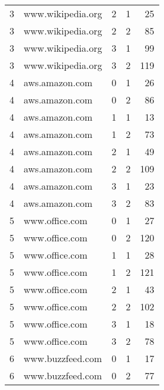 \begin{tabular}{rllrr}
  3 &    www.wikipedia.org &                  2 &       1 &               25 \\
  3 &    www.wikipedia.org &                  2 &       2 &               85 \\
  3 &    www.wikipedia.org &                  3 &       1 &               99 \\
  3 &    www.wikipedia.org &                  3 &       2 &              119 \\
  4 &       aws.amazon.com &                  0 &       1 &               26 \\
  4 &       aws.amazon.com &                  0 &       2 &               86 \\
  4 &       aws.amazon.com &                  1 &       1 &               13 \\
  4 &       aws.amazon.com &                  1 &       2 &               73 \\
  4 &       aws.amazon.com &                  2 &       1 &               49 \\
  4 &       aws.amazon.com &                  2 &       2 &              109 \\
  4 &       aws.amazon.com &                  3 &       1 &               23 \\
  4 &       aws.amazon.com &                  3 &       2 &               83 \\
  5 &       www.office.com &                  0 &       1 &               27 \\
  5 &       www.office.com &                  0 &       2 &              120 \\
  5 &       www.office.com &                  1 &       1 &               28 \\
  5 &       www.office.com &                  1 &       2 &              121 \\
  5 &       www.office.com &                  2 &       1 &               43 \\
  5 &       www.office.com &                  2 &       2 &              102 \\
  5 &       www.office.com &                  3 &       1 &               18 \\
  5 &       www.office.com &                  3 &       2 &               78 \\
  6 &     www.buzzfeed.com &                  0 &       1 &               17 \\
  6 &     www.buzzfeed.com &                  0 &       2 &               77 \\

\end{tabular}
